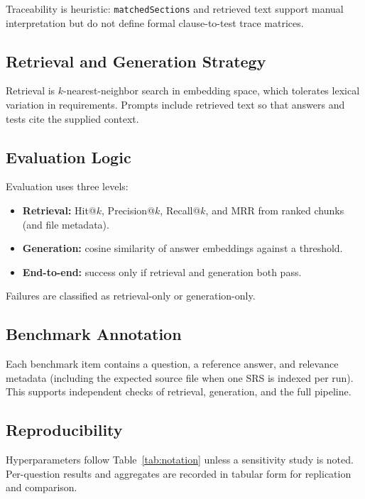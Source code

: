 \documentclass[conference]{IEEEtran}
\begin{document}
Traceability is heuristic: \texttt{matchedSections} and retrieved text support manual interpretation but do not define formal clause-to-test trace matrices.

\subsection{Retrieval and Generation Strategy}

Retrieval is $k$-nearest-neighbor search in embedding space, which tolerates lexical variation in requirements. Prompts include retrieved text so that answers and tests cite the supplied context.

\subsection{Evaluation Logic}

Evaluation uses three levels:

\begin{itemize}
    \item \textbf{Retrieval:} Hit@$k$, Precision@$k$, Recall@$k$, and MRR from ranked chunks (and file metadata).
    \item \textbf{Generation:} cosine similarity of answer embeddings against a threshold.
    \item \textbf{End-to-end:} success only if retrieval and generation both pass.
\end{itemize}

Failures are classified as retrieval-only or generation-only.

\subsection{Benchmark Annotation}

Each benchmark item contains a question, a reference answer, and relevance metadata (including the expected source file when one SRS is indexed per run). This supports independent checks of retrieval, generation, and the full pipeline.

\subsection{Reproducibility}

Hyperparameters follow Table~\ref{tab:notation} unless a sensitivity study is noted. Per-question results and aggregates are recorded in tabular form for replication and comparison.
\end{document}
